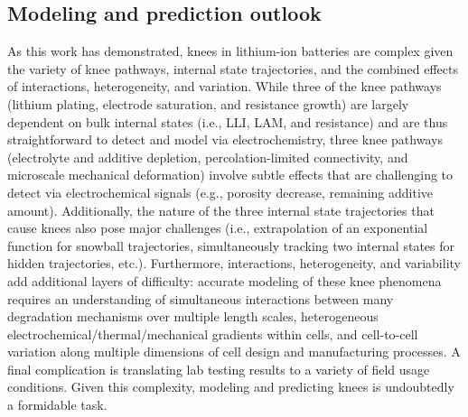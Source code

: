 \documentclass[journal=jpclcd,manuscript=article]{achemso}
\newcommand{\gbox}[1]{{
\fbox{
\parbox{0.8\textwidth}{  \fbox{$\triangleright$\textcolor{blue}{\textbf{Gon}:}} 
#1
}}}}
\newcommand{\pbox}[1]{{
\fbox{
\parbox{0.8\textwidth}{  \fbox{$\triangleright$\textcolor{blue}{\textbf{Peter}:}} 
#1
}}}}
\begin{document}





\subsection{Modeling and prediction outlook}

As this work has demonstrated, knees in lithium-ion batteries are complex given the variety of knee pathways, internal state trajectories, and the combined effects of interactions, heterogeneity, and variation. While three of the knee pathways (lithium plating, electrode saturation, and resistance growth) are largely dependent on bulk internal states (i.e., LLI, LAM, and resistance) and are thus straightforward to detect and model via electrochemistry, three knee pathways (electrolyte and additive depletion, percolation-limited connectivity, and microscale mechanical deformation) involve subtle effects that are challenging to detect via electrochemical signals (e.g., porosity decrease, remaining additive amount). 
Additionally, the nature of the three internal state trajectories that cause knees also pose major challenges (i.e., extrapolation of an exponential function for snowball trajectories, simultaneously tracking two internal states for hidden trajectories, etc.).
Furthermore, interactions, heterogeneity, and variability add additional layers of difficulty: accurate modeling of these knee phenomena requires an understanding of simultaneous interactions between many degradation mechanisms over multiple length scales, heterogeneous electrochemical/thermal/mechanical gradients within cells, and cell-to-cell variation along multiple dimensions of cell design and manufacturing processes.
A final complication is translating lab testing results to a variety of field usage conditions.
Given this complexity, modeling and predicting knees is undoubtedly a formidable task.
\end{document}
